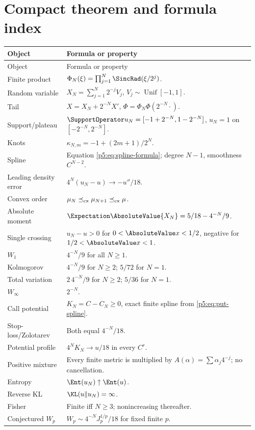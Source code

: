 \documentclass[11pt,oneside]{article}
\numberwithin{equation}{section}
\theoremstyle{definition}
\theoremstyle{remark}
\begin{document}
\section{Compact theorem and formula index}
\label{p5:sec:index}

\begin{longtable}{@{}p{}p{}@{}}
\toprule
Object & Formula or property\\
\midrule
\endfirsthead
\toprule
Object & Formula or property\\
\midrule
\endhead
Finite product & $\Phi_N(\xi)=\prod_{j=1}^{N}\SincRad(\xi/2^j)$.\\
Random variable & $X_N=\sum_{j=1}^{N}2^{-j}V_j$, $V_j\sim\operatorname{Unif}[-1,1]$.\\
Tail & $X=X_N+2^{-N}X'$, $\Phi=\Phi_N\Phi(2^{-N}\cdot)$.\\
Support/plateau & $\SupportOperator u_N=[-1+2^{-N},1-2^{-N}]$, $u_N=1$ on $[-2^{-N},2^{-N}]$.\\
Knots & $\kappa_{N,m}=-1+(2m+1)/2^N$.\\
Spline & Equation \eqref{p5:eq:spline-formula}; degree $N-1$, smoothness $C^{N-2}$.\\
Leading density error & $4^N(u_N-u)\to-u''/18$.\\
Convex order & $\mu_N\preceq_{\rm cx}\mu_{N+1}\preceq_{\rm cx}\mu$.\\
Absolute moment & $\Expectation\AbsoluteValue{X_N}=5/18-4^{-N}/9$.\\
Single crossing & $u_N-u>0$ for $0<\AbsoluteValue x<1/2$, negative for $1/2<\AbsoluteValue x<1$.\\
$W_1$ & $4^{-N}/9$ for all $N\ge1$.\\
Kolmogorov & $4^{-N}/9$ for $N\ge2$; $5/72$ for $N=1$.\\
Total variation & $2\,4^{-N}/9$ for $N\ge2$; $5/36$ for $N=1$.\\
$W_\infty$ & $2^{-N}$.\\
Call potential & $K_N=C-C_N\ge0$, exact finite spline from \eqref{p5:eq:put-spline}.\\
Stop-loss/Zolotarev & Both equal $4^{-N}/18$.\\
Potential profile & $4^NK_N\to u/18$ in every $C^r$.\\
Positive mixture & Every finite metric is multiplied by $A(\alpha)=\sum\alpha_j4^{-j}$; no cancellation.\\
Entropy & $\Ent(u_N)\uparrow\Ent(u)$.\\
Reverse KL & $\KL(u\Vert u_N)=\infty$.\\
Fisher & Finite iff $N\ge3$; nonincreasing thereafter.\\
Conjectured $W_p$ & $W_p\sim4^{-N}J_p^{1/p}/18$ for fixed finite $p$.\\
\bottomrule
\end{longtable}
\end{document}
